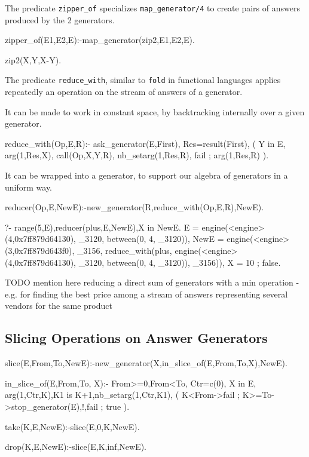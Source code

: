 \documentclass{new_tlp}
\begin{document}
The predicate {\tt zipper\_of} specializes {\tt map\_generator/4} to create
pairs of answers produced by the 2 generators.
\begin{code}
zipper_of(E1,E2,E):-map_generator(zip2,E1,E2,E).

zip2(X,Y,X-Y).
\end{code}
The predicate {\tt reduce\_with}, similar to {\tt fold} in functional languages
applies repeatedly an operation on the stream of answers of a generator.

It can be made to work in constant space, by
backtracking internally over a given generator.
\begin{code}
reduce_with(Op,E,R):-
  ask_generator(E,First),
  Res=result(First),
  ( Y in E,
    arg(1,Res,X),
    call(Op,X,Y,R),
    nb_setarg(1,Res,R),
    fail
  ; arg(1,Res,R)
  ).
\end{code}

It can be wrapped into a generator, to support our algebra of generators in a uniform way.

\begin{code}
reducer(Op,E,NewE):-new_generator(R,reduce_with(Op,E,R),NewE).
\end{code}

\BX
\begin{codex}
?- range(5,E),reducer(plus,E,NewE),X in NewE.
E = engine(<engine>(4,0x7ff879d64130), _3120, between(0, 4, _3120)),
NewE = engine(<engine>(3,0x7ff879d643f0), _3156, reduce_with(plus,
engine(<engine>(4,0x7ff879d64130), _3120, between(0, 4, _3120)), _3156)),
X = 10 ;
false.
\end{codex}
\EX
\BI
\I TODO mention here reducing a direct sum of generators with a min operation - e.g. for finding the best price among a stream of answers representing several vendors for the same product
\EI

\subsection{Slicing Operations on Answer Generators}
\begin{code}
slice(E,From,To,NewE):-new_generator(X,in_slice_of(E,From,To,X),NewE).

in_slice_of(E,From,To, X):-
  From>=0,From<To,
  Ctr=c(0),
  X in E,
  arg(1,Ctr,K),K1 is K+1,nb_setarg(1,Ctr,K1),
  (
    K<From->fail
  ; K>=To->stop_generator(E),!,fail
  ; true
  ).
  
take(K,E,NewE):-slice(E,0,K,NewE).

drop(K,E,NewE):-slice(E,K,inf,NewE).
\end{code}
\end{document}
